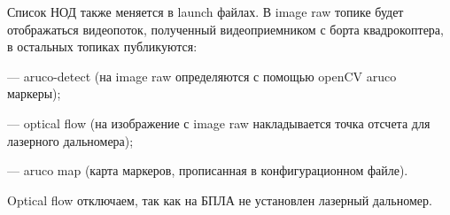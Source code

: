 Список НОД также меняется в launch файлах. В image raw топике будет отображаться видеопоток, полученный видеоприемником с борта квадрокоптера, в остальных топиках публикуются:

--- aruco-detect (на image raw определяются с помощью openCV aruco маркеры);

--- optical flow (на изображение с image raw накладывается точка отсчета для лазерного дальномера);

--- aruco map (карта маркеров, прописанная в конфигурационном файле).

Optical flow отключаем, так как на БПЛА не установлен лазерный дальномер.